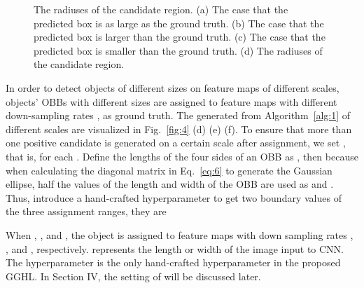 \begin{figure}[tbp]
	\vspace{-1.2em}
	\centering
	\vspace{-1em}
	\caption{The radiuses of the candidate region. (a) The case that the predicted box is as large as the ground truth. (b) The case that the predicted box is larger than the ground truth. (c) The case that the predicted box is smaller than the ground truth. (d) The radiuses of the candidate region.}
	\label{fig:5}
	\vspace{-1em}
\end{figure} 

In order to detect objects of different sizes on feature maps of different scales, objects’ OBBs with different sizes are assigned to feature maps with different down-sampling rates , as ground truth. The generated  from Algorithm~\ref{alg:1} of different scales are visualized in Fig.~\ref{fig:4} (d) (e) (f). To ensure that more than one positive candidate is generated on a certain scale after assignment, we set , that is,  for each . Define the lengths of the four sides of an OBB as , then  because when calculating the diagonal matrix  in Eq.~\ref{eq:6} to generate the Gaussian ellipse, half the values of the length and width of the OBB are used as  and . Thus, introduce a hand-crafted hyperparameter  to get two boundary values of the three assignment ranges, they are

When , , and , the object is assigned to feature maps with down sampling rates , , and , respectively.  represents the length or width of the image input to CNN. The hyperparameter  is the only hand-crafted hyperparameter in the proposed GGHL. In Section IV, the setting of  will be discussed later.

\vspace{-0.5em}
